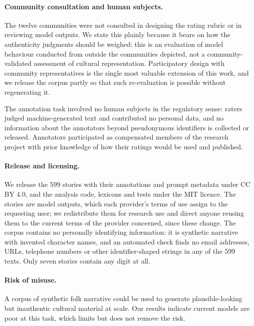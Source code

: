 \documentclass[11pt]{article}
\begin{document}
\paragraph{Community consultation and human subjects.} The twelve
communities were not consulted in designing the rating rubric or in reviewing
model outputs. We state this plainly because it bears on how the authenticity
judgments should be weighed: this is an evaluation of model behaviour conducted
from outside the communities depicted, not a community-validated assessment of
cultural representation. Participatory design with community representatives is
the single most valuable extension of this work, and we release the corpus
partly so that such re-evaluation is possible without regenerating it.

The annotation task involved no human subjects in the regulatory sense: raters
judged machine-generated text and contributed no personal data, and no
information about the annotators beyond pseudonymous identifiers is collected or
released. Annotators participated as compensated members of the research project
with prior knowledge of how their ratings would be used and published.

\paragraph{Release and licensing.} We release the 599 stories with their
annotations and prompt metadata under CC BY 4.0, and the analysis code,
lexicons and tests under the MIT licence. The stories are model outputs, which
each provider's terms of use assign to the requesting user; we redistribute them
for research use and direct anyone reusing them to the current terms of the
provider concerned, since these change. The corpus contains no personally
identifying information: it is synthetic narrative with invented character
names, and an automated check finds no email addresses, URLs, telephone numbers
or other identifier-shaped strings in any of the 599 texts. Only seven stories
contain any digit at all.

\paragraph{Risk of misuse.} A corpus of synthetic folk narrative could be used
to generate plausible-looking but inauthentic cultural material at scale. Our
results indicate current models are poor at this task, which limits but does
not remove the risk.
\end{document}
